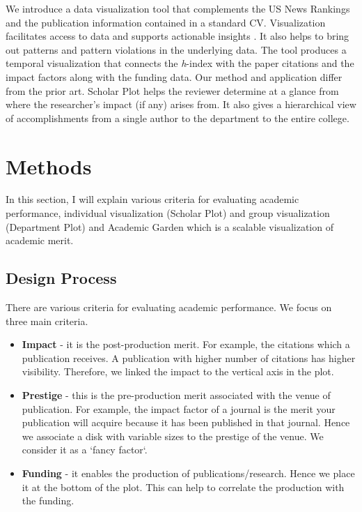 We introduce a data visualization tool that complements the US News Rankings and the publication information contained in a standard CV. Visualization facilitates access to data and supports actionable insights \cite{Yi:2008:UCI}. It also helps to bring out patterns and pattern violations in the underlying data.
The tool produces a temporal visualization that connects the {\it h}-index with the paper citations and the impact factors along with the funding data. Our method and application differ from the prior art. Scholar Plot helps the reviewer determine at a glance from where the researcher's impact (if any) arises from. It also gives a hierarchical view of accomplishments from a single author to the department to the entire college.






\chapter{Methods}\label{chap:Methods }

In this section, I will explain various criteria for evaluating academic performance, individual visualization (Scholar Plot) and group visualization (Department Plot) and Academic Garden which is a scalable visualization of academic merit.


\section{Design Process}
There are various criteria for evaluating academic performance. We focus on three main criteria.
\begin{itemize}
\item \textbf{Impact} - it is the post-production merit. For example, the citations which a publication receives. A publication with higher number of citations has higher visibility. Therefore, we linked the impact to the vertical axis in the plot.
\item \textbf{Prestige} - this is the pre-production merit associated with the venue of publication. For example, the impact factor of a journal is the merit your publication will acquire because it has been published in that journal. Hence we associate a disk with variable sizes to the prestige of the venue. We consider it as a `fancy factor`.
\item \textbf{Funding} - it enables the production of publications/research. Hence we place it at the bottom of the plot. This can help to correlate the production with the funding.
\end{itemize}

